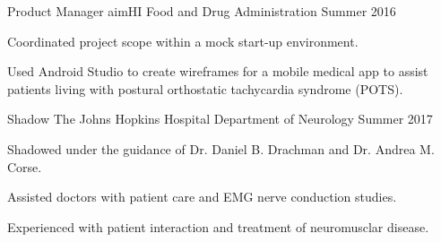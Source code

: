 

\begin{cventries}

  \cventry
    {Product Manager} %
    {aimHI} %
    {Food and Drug Administration} %
    {Summer 2016} %
    {
      \begin{cvitems} %
        \item {Coordinated project scope within a mock start-up environment.}
        \item {Used Android Studio to create wireframes for a mobile medical app to assist patients living with postural orthostatic tachycardia syndrome (POTS).}
      \end{cvitems}
    }

  \cventry
    {Shadow} %
    {The Johns Hopkins Hospital} %
    {Department of Neurology} %
    {Summer 2017} %
    {
      \begin{cvitems} %
        \item {Shadowed under the guidance of Dr. Daniel B. Drachman and Dr. Andrea M. Corse.}
        \item {Assisted doctors with patient care and EMG nerve conduction studies.}
        \item {Experienced with patient interaction and treatment of neuromusclar disease.}
      \end{cvitems}
    }

\end{cventries}
